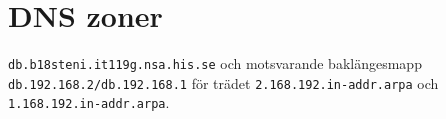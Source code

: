\documentclass[swedish,11pt,a4paper]{article}
\begin{document}
    \section{DNS zoner}\label{sec:appendix_dns_zones}

    \texttt{db.b18steni.it119g.nsa.his.se} och motsvarande baklängesmapp\@
    \texttt{ db.192.168.2/db.192.168.1} för trädet \texttt{2.168.192.in-addr.arpa}
    och \texttt{1.168.192.in-addr.arpa}.

    \printbibliography{}
  
\end{document}

